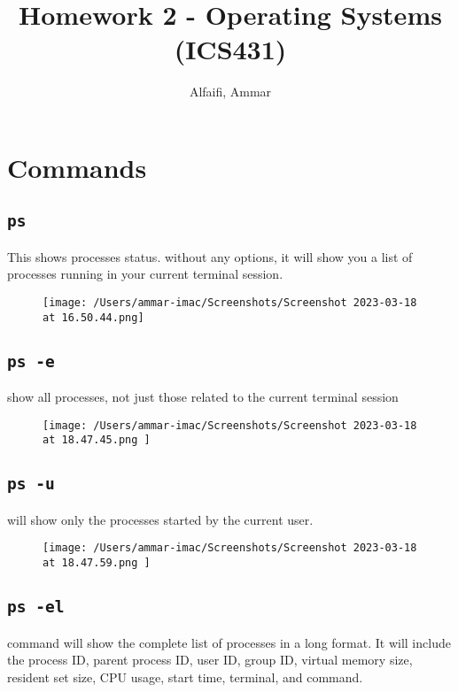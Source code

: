 \documentclass{article}
\title{Homework 2 - Operating Systems (ICS431)}
\author{Alfaifi, Ammar}
\date{}
\def\c#1{\texttt{#1}}
\begin{document}
\maketitle

\section{Commands}%
\subsection{\c{ps}}%

This shows processes status. without any options, it will show you a list of processes
running in your current terminal session.

\begin{figure}[ht]
  \centering
  \texttt{[image: /Users/ammar-imac/Screenshots/Screenshot 2023-03-18 at 16.50.44.png]}
\end{figure}


\subsection{\c{ps -e}}%

show all processes, not just those related to the current terminal session

\begin{figure}[ht]
  \centering
  \texttt{[image: /Users/ammar-imac/Screenshots/Screenshot 2023-03-18 at 18.47.45.png ]}
\end{figure}


\subsection{\c{ps -u}}%

will show only the processes started by the current user.

\begin{figure}[ht]
  \centering
  \texttt{[image: /Users/ammar-imac/Screenshots/Screenshot 2023-03-18 at 18.47.59.png ]}
\end{figure}

\newpage

\subsection{\c{ps -el}}%
command will show the complete list of processes in a long format. It will include the process ID, parent process ID, user ID, group ID, virtual memory size, resident set size, CPU usage, start time, terminal, and command.
\end{document}
